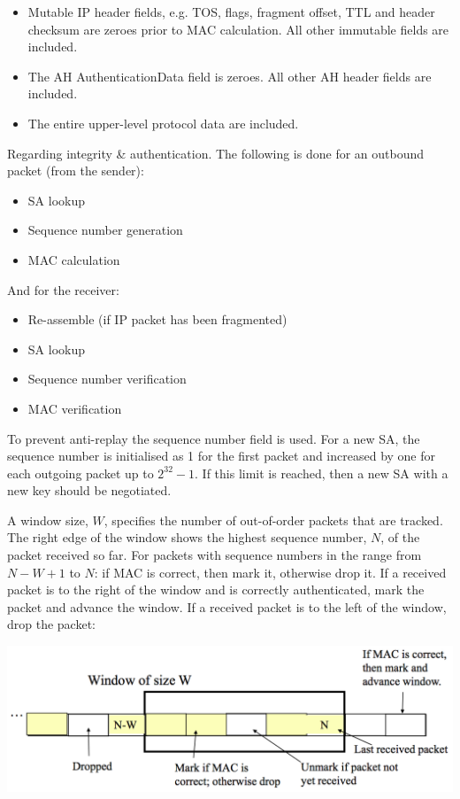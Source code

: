 \documentclass{article}
\begin{document}
\begin{itemize}
  \item Mutable IP header fields, e.g. TOS, flags, fragment offset, TTL and header checksum are zeroes prior to MAC calculation. All other immutable fields are included.
  \item The AH AuthenticationData field is zeroes. All other AH header fields are included.
  \item The entire upper-level protocol data are included.
\end{itemize}
Regarding integrity \& authentication. The following is done for an outbound packet (from the sender):
\begin{itemize}
  \item SA lookup
  \item Sequence number generation
  \item MAC calculation
\end{itemize}
And for the receiver:
\begin{itemize}
  \item Re-assemble (if IP packet has been fragmented)
  \item SA lookup
  \item Sequence number verification
  \item MAC verification
\end{itemize}
To prevent anti-replay the sequence number field is used. For a new SA, the sequence number is initialised as 1 for the first packet and increased by one for each outgoing packet up to $2^{32}-1$. If this limit is reached, then a new SA with a new key should be negotiated.

A window size, $W$, specifies the number of out-of-order packets that are tracked. The right edge of the window shows the highest sequence number, $N$, of the packet received so far. For packets with sequence numbers in the range from $N-W+1$ to $N$: if MAC is correct, then mark it, otherwise drop it. If a received packet is to the right of the window and is correctly authenticated, mark the packet and advance the window. If a received packet is to the left of the window, drop the packet:
\begin{center}
  \includegraphics[scale=0.6]{ah-anti-replay.png}
\end{center}
\end{document}
